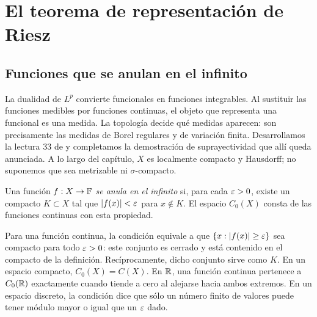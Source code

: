 \chapter{El teorema de representación de Riesz}\label{v2:cap16}\label{cap:v2-16}
\section{Funciones que se anulan en el infinito}\label{lectura:v2-33}
La dualidad de $L^p$ convierte funcionales en funciones integrables. Al sustituir las funciones medibles por funciones continuas, el objeto que representa una funcional es una medida. La topología decide qué medidas aparecen: son precisamente las medidas de Borel regulares y de variación finita. Desarrollamos la lectura 33 de \cite{valencia2} y completamos la demostración de suprayectividad que allí queda anunciada. A lo largo del capítulo, $X$ es localmente compacto y Hausdorff; no suponemos que sea metrizable ni $\sigma$-compacto.

\begin{definicion}
Una función $f:X\to\mathbb F$ \emph{se anula en el infinito} si, para cada $\varepsilon>0$, existe un compacto $K\subset X$ tal que $|f(x)|<\varepsilon$ para $x\notin K$. El espacio $C_0(X)$ consta de las funciones continuas con esta propiedad.
\end{definicion}
Para una función continua, la condición equivale a que $\{x:|f(x)|\ge\varepsilon\}$ sea compacto para todo $\varepsilon>0$: este conjunto es cerrado y está contenido en el compacto de la definición. Recíprocamente, dicho conjunto sirve como $K$. En un espacio compacto, $C_0(X)=C(X)$. En $\mathbb R$, una función continua pertenece a $C_0(\mathbb R)$ exactamente cuando tiende a cero al alejarse hacia ambos extremos. En un espacio discreto, la condición dice que sólo un número finito de valores puede tener módulo mayor o igual que un $\varepsilon$ dado.

